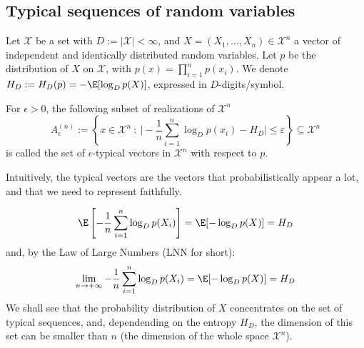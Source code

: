 \documentclass{../cs-classes/cs-classes}
\newcommand*{\X}{\mathcal{X}}
\begin{document}
\subsection{Typical sequences of random variables}
\begin{definition}
    Let $\X$ be a set with $D:=|\X|<\infty$, and $X=(X_1, \dots, X_n)\in \X^n$ a vector of independent and identically distributed random variables. Let $p$ be the distribution of $X$ on $\X$, with $p(x)=\prod_{i=1}^n p(x_i)$. We denote $H_D:=H_D(p)=-\E[\log_Dp(X)]$, expressed in $D$-digits/symbol.

    For $\epsilon>0$, the following subset of realizations of $\X^n$
    \begin{equation}
        A_\epsilon^{(n)}:=\left\{x\in \X^n \: : \: \big| -\frac{1}{n}\sum_{i=1}^n \log_Dp(x_i)-H_D\big|\leq \varepsilon\right\}\subseteq \X^n
    \end{equation}
    is called the set of $\epsilon$-typical vectors in $\X^n$ with respect to $p$.

    Intuitively, the typical vectors are the vectors that probabilistically appear a lot, and that we need to represent faithfully.
\end{definition}

\begin{remark}
    \begin{equation*}
        \E\left[-\frac{1}{n}\sum_{i=1}^n \log_Dp(X_i)\right] = \E[-\log_Dp(X)]=H_D
    \end{equation*}
    and, by the Law of Large Numbers (LNN for short):
    \begin{equation*}
        \lim_{n\to+\infty}-\frac{1}{n}\sum_{i=1}^n \log_Dp(X_i) = \E[-\log_D p(X)] = H_D
    \end{equation*}
    We shall see that the probability distribution of $X$ concentrates on the set of typical sequences, and, dependending on the entropy $H_D$, the dimension of this set can be smaller than $n$ (the dimension of the whole space $\X^n$).
\end{remark}
\end{document}
